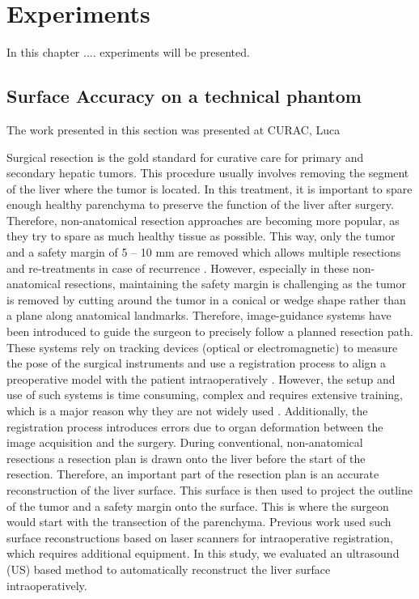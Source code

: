 \chapter{Experiments}
In this chapter .... experiments will be presented. 
\section{Surface Accuracy on a technical phantom}
The work presented in this section was presented at CURAC, Luca

Surgical resection is the gold standard for curative care for primary and
secondary hepatic tumors. This procedure usually involves removing the segment
of the liver where the tumor is located. In this treatment, it is important to
spare enough healthy parenchyma to preserve the function of the liver after
surgery. Therefore, non-anatomical resection approaches are becoming more
popular, as they try to spare as much healthy tissue as possible. This way, only
the tumor and a safety margin of 5 – 10 mm are removed which allows multiple
resections and re-treatments in case of recurrence \cite{aghayan2018laparoscopic}.
However, especially in these non-anatomical resections, maintaining the safety
margin is challenging as the tumor is removed by cutting around the tumor in a
conical or wedge shape rather than a plane along anatomical landmarks.
Therefore, image-guidance systems have been introduced to guide the surgeon to
precisely follow a planned resection path. These systems rely on tracking
devices (optical or electromagnetic) to measure the pose of the surgical
instruments and use a registration process to align a preoperative model with
the patient intraoperatively \cite{lango2012navigated}\cite{banz2016intraoperative}. However, the setup and use of such systems
is time consuming, complex and requires extensive training, which is a major
reason why they are not widely used \cite{kingham2013evolution}.
Additionally, the registration process introduces errors due to organ deformation between the image acquisition and the surgery. 
During conventional, non-anatomical resections a resection plan is drawn onto
the liver before the start of the resection. Therefore, an important part of the
resection plan is an accurate reconstruction of the liver surface. This surface
is then used to project the outline of the tumor and a safety margin onto the
surface.
This is where the surgeon would start with the transection of the parenchyma.
Previous work used such surface reconstructions based on laser scanners \cite{simpson2016current} for
intraoperative registration, which requires additional equipment.
In this study, we evaluated an ultrasound (US) based method to automatically reconstruct the liver surface intraoperatively.


